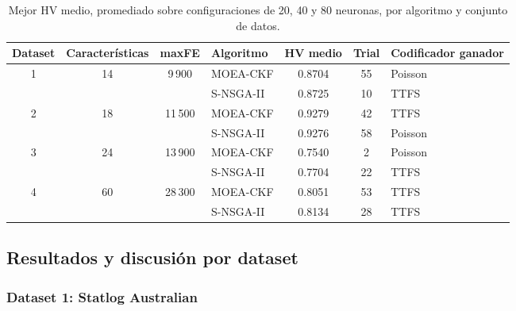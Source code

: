 \begin{table}[htbp]
\centering
\small
\caption{Mejor HV medio, promediado sobre configuraciones de 20, 40 y 80 neuronas, por algoritmo y conjunto de datos.}
\label{tab:hv_por_dataset_resultados}
\begin{tabular}{ccclccl}
\hline
\textbf{Dataset}            & \textbf{Características}     & \textbf{maxFE}                    & \textbf{Algoritmo} & \textbf{HV medio} & \textbf{Trial}& \textbf{Codificador ganador} \\ \hline
\multirow{2}{*}{1} & \multirow{2}{*}{14} & \multirow{2}{*}{9\,900}  & MOEA-CKF  & 0.8704   & 55    & Poisson             \\
                   &                     &                          & S-NSGA-II & 0.8725   & 10    & TTFS                \\ \hline
\multirow{2}{*}{2} & \multirow{2}{*}{18} & \multirow{2}{*}{11\,500} & MOEA-CKF  & 0.9279   & 42    & TTFS                \\
                   &                     &                          & S-NSGA-II & 0.9276   & 58    & Poisson             \\ \hline
\multirow{2}{*}{3} & \multirow{2}{*}{24} & \multirow{2}{*}{13\,900} & MOEA-CKF  & 0.7540   & 2     & Poisson             \\
                   &                     &                          & S-NSGA-II & 0.7704   & 22    & TTFS                \\ \hline
\multirow{2}{*}{4} & \multirow{2}{*}{60} & \multirow{2}{*}{28\,300} & MOEA-CKF  & 0.8051   & 53    & TTFS                \\
                   &                     &                          & S-NSGA-II & 0.8134   & 28    & TTFS   \\ \hline            
\end{tabular}
\end{table}

\subsection{Resultados y discusión por dataset}

\subsubsection{Dataset 1: Statlog Australian}


